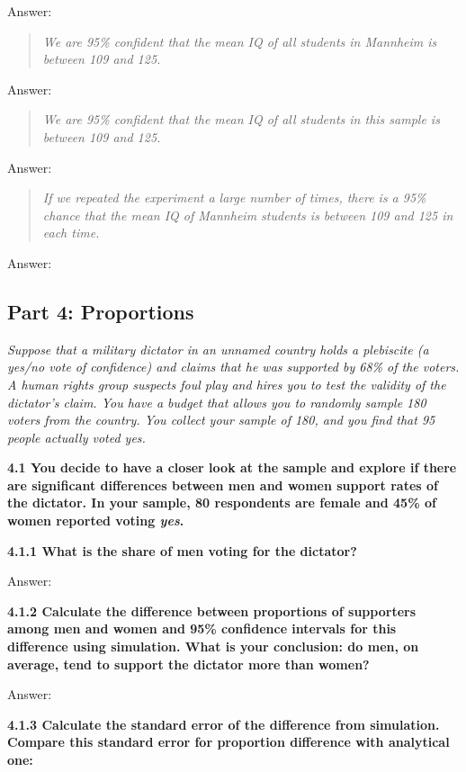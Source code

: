 \documentclass[
]{article}
\begin{document}
Answer:

\begin{quote}
\emph{We are 95\% confident that the mean IQ of all students in Mannheim
is between 109 and 125.}
\end{quote}

Answer:

\begin{quote}
\emph{We are 95\% confident that the mean IQ of all students in this
sample is between 109 and 125.}
\end{quote}

Answer:

\begin{quote}
\emph{If we repeated the experiment a large number of times, there is a
95\% chance that the mean IQ of Mannheim students is between 109 and 125
in each time.}
\end{quote}

Answer:

\hypertarget{part-4-proportions}{%
\subsection{Part 4: Proportions}\label{part-4-proportions}}

\emph{Suppose that a military dictator in an unnamed country holds a
plebiscite (a yes/no vote of confidence) and claims that he was
supported by 68\% of the voters. A human rights group suspects foul play
and hires you to test the validity of the dictator's claim. You have a
budget that allows you to randomly sample 180 voters from the country.
You collect your sample of 180, and you find that 95 people actually
voted yes.}

\textbf{4.1 You decide to have a closer look at the sample and explore
if there are significant differences between men and women support rates
of the dictator. In your sample, 80 respondents are female and 45\% of
women reported voting \emph{yes}.}

\textbf{4.1.1 What is the share of men voting for the dictator?}

Answer:

\textbf{4.1.2 Calculate the difference between proportions of supporters
among men and women and 95\% confidence intervals for this difference
using simulation. What is your conclusion: do men, on average, tend to
support the dictator more than women?}

Answer:

\textbf{4.1.3 Calculate the standard error of the difference from
simulation. Compare this standard error for proportion difference with
analytical one:}
\end{document}
